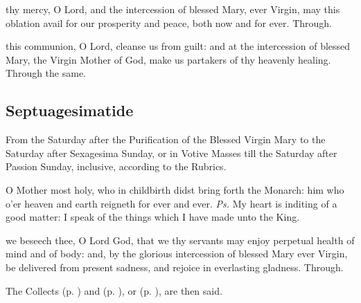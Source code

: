 
\vspace{-0.15\baselineskip}

\secret

\vspace{-0.1\baselineskip}

 thy mercy, O Lord, and the intercession of blessed Mary, ever Virgin, may this oblation avail for our prosperity and peace, both now and for ever. Through.

\vspace{-0.5\baselineskip}

\postcommunion

\vspace{-0.25\baselineskip}

 this communion, O Lord, cleanse us from guilt: and at the intercession of blessed Mary, the Virgin Mother of God, make us partakers of thy heavenly healing. Through the same.


\clearpage
\subsection{Septuagesimatide}
\begin{rubric}
    {From the Saturday after the Purification of the Blessed Virgin Mary to the Saturday after Sexagesima Sunday, or in Votive Masses till the Saturday after Passion Sunday, inclusive, according to the Rubrics.}
\end{rubric}
\introit
{} O Mother most holy, who in childbirth didst bring forth the Monarch: him who o'er heaven and earth reigneth for ever and ever. \textit{Ps.} My heart is inditing of a good matter: I speak of the things which I have made unto the King.

\collect
{} we beseech thee, O Lord God, that we thy servants may enjoy perpetual health of mind and of body: and, by the glorious intercession of blessed Mary ever Virgin, be delivered from present sadness, and rejoice in everlasting gladness. Through.
\begin{rubric}
    The Collects  (p. \pageref{SPHolyGhost}) and  (p. \pageref{SPAgainst}), or  (p. \pageref{SPChiefBishop}), are then said.
\end{rubric}


